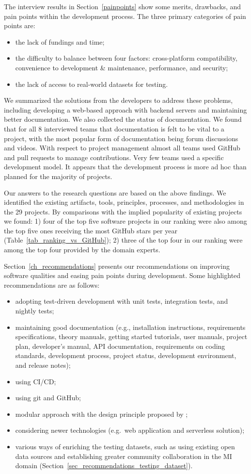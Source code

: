 \documentclass[final, 3p, times, authoryear]{elsarticle}
\begin{document}
The interview results in Section~\ref{painpoints} show some merits, drawbacks,
and pain points within the development process. The three primary categories of
pain points are:
\begin{itemize}
\item the lack of fundings and time;
\item the difficulty to balance between four factors: cross-platform
compatibility, convenience to development \& maintenance, performance, and
security;
\item the lack of access to real-world datasets for testing.
\end{itemize}
We summarized the solutions from the developers to address these problems,
including developing a web-based approach with backend servers and maintaining
better documentation. We also collected the status of documentation.  We found
that for all 8 interviewed teams that documentation is felt to be vital to a
project, with the most popular form of documentation being forum discussions and
videos.  With respect to project management almost all teams used GitHub and
pull requests to manage contributions.  Very few teams used a specific
development model.  It appears that the development process is more ad hoc than
planned for the majority of projects.

Our answers to the research questions are based on the above findings. We
identified the existing artifacts, tools, principles, processes, and
methodologies in the 29 projects. By comparisons with the implied popularity of
existing projects we found: 1) four of the top five software projects in our
ranking were also among the top five ones receiving the most GitHub stars per
year (Table~\ref{tab_ranking_vs_GitHub}); 2) three of the top four in our
ranking were among the top four provided by the domain experts.

Section~\ref{ch_recommendations} presents our recommendations on improving
software qualities and easing pain points during development. Some highlighted
recommendations are as follows:
\begin{itemize}
\item adopting test-driven development with unit tests, integration tests, and
nightly tests;
\item maintaining good documentation (e.g., installation instructions,
requirements specifications, theory manuals, getting started tutorials, user
manuals, project plan, developer’s manual, API documentation, requirements on
coding standards, development process, project status, development environment,
and release notes);
\item using CI/CD;
\item using git and GitHub;
\item modular approach with the design principle proposed by
\citet{ParnasEtAl2000};
\item considering newer technologies (e.g.\ web application and serverless
solution);
\item various ways of enriching the testing datasets, such as using existing
open data sources and establishing greater community collaboration in the MI
domain (Section~\ref{sec_recommendations_testing_dataset}).
\end{itemize}
\end{document}
